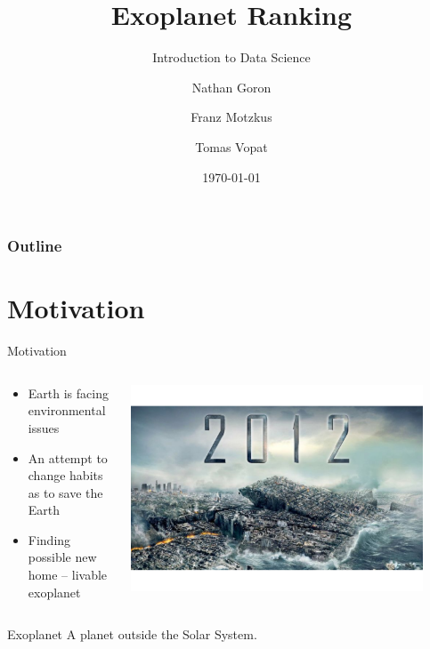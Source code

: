 \documentclass[aspectratio=169]{beamer}
\title{Exoplanet Ranking}
\subtitle{Introduction to Data Science}
\author[Goron, Motzkus, Vopat]{Nathan Goron \and Franz Motzkus \and Tomas Vopat}
\institute[HY]{University of Helsinki}
\date{\today}
\begin{document}
\begin{frame}
    \titlepage
\end{frame}

\begin{frame}
    \frametitle{Outline}
    \tableofcontents
\end{frame}

\section{Motivation}

\begin{frame}{Motivation}
    \begin{columns}
        \begin{column}{0.5\textwidth}
            \begin{itemize}
                \item Earth is facing environmental issues
                \item An attempt to change habits as to save the Earth
                \item Finding possible new home -- livable exoplanet
            \end{itemize}
        \end{column}
        \begin{column}{0.5\textwidth}
            \begin{center}
                \includegraphics[width=0.9\textwidth]{graphics/apocalypse.pdf}
            \end{center}
        \end{column}
    \end{columns}
    \begin{block}{Exoplanet}
        A planet outside the Solar System. 
    \end{block}
\end{frame}
\end{document}
